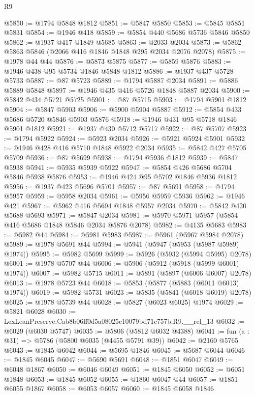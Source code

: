 \begin{lexlean}{R9}
\begin{coremodule}
@5850 := @1794 @5848 @1812
@5851 := @5847 @5850
@5853 := @5845 @5851 @5831
@5854 := @1946 @418
@5859 := @5854 @440 @5686 @5736 @5846 @5850
@5862 := @1937 @417 @1849 @5685
@5863 := @2033 @2034
@5873 := @5862 @5863 @5846 (@2066 @416 @1846 @1848 @295 @2034 @2076 @2078)
@5875 := @1978 @44 @44
@5876 := @5873 @5875
@5877 := @5859 @5876
@5883 := @1946 @438 @95 @5734 @1846 @5848 @1812
@5886 := @1937 @437 @5728 @5733
@5887 := @87 @5723
@5889 := @1794 @5887 @2034
@5891 := @5886 @5889 @5848
@5897 := @1946 @435 @416 @5726 @1848 @5887 @2034
@5900 := @5842 @434 @5721 @5725
@5901 := @87 @5715
@5903 := @1794 @5901 @1812
@5904 := @5847 @5903
@5906 := @5900 @5904 @5887
@5912 := @5854 @433 @5686 @5720 @5846 @5903 @5876
@5918 := @1946 @431 @95 @5718 @1846 @5901 @1812
@5921 := @1937 @430 @5712 @5717
@5922 := @87 @5707
@5923 := @1794 @5922
@5924 := @5923 @2034
@5926 := @5921 @5924 @5901
@5932 := @1946 @428 @416 @5710 @1848 @5922 @2034
@5935 := @5842 @427 @5705 @5709
@5936 := @87 @5699
@5938 := @1794 @5936 @1812
@5939 := @5847 @5938
@5941 := @5935 @5939 @5922
@5947 := @5854 @426 @5686 @5704 @5846 @5938 @5876
@5953 := @1946 @424 @95 @5702 @1846 @5936 @1812
@5956 := @1937 @423 @5696 @5701
@5957 := @87 @5691
@5958 := @1794 @5957
@5959 := @5958 @2034
@5961 := @5956 @5959 @5936
@5962 := @1946 @421
@5967 := @5962 @416 @5694 @1848 @5957 @2034
@5970 := @5842 @420 @5688 @5693
@5971 := @5847 @2034
@5981 := @5970 @5971 @5957 (@5854 @416 @5686 @1848 @5846 @2034 @5876 @2078)
@5982 := @4135 @5683
@5983 := @5982 @44
@5984 := @5981 @5983
@5987 := @5961 (@5967 @5984 @2078)
@5989 := @1978 @5691 @44
@5994 := @5941 (@5947 (@5953 (@5987 @5989) @1974))
@5995 := @5982 @5699
@5999 := @5926 (@5932 (@5994 @5995) @2078)
@6001 := @1978 @5707 @44
@6006 := @5906 (@5912 (@5918 (@5999 @6001) @1974))
@6007 := @5982 @5715
@6011 := @5891 (@5897 (@6006 @6007) @2078)
@6013 := @1978 @5723 @44
@6018 := @5853 (@5877 (@5883 (@6011 @6013) @1974))
@6019 := @5982 @5731
@6023 := @5835 (@5841 (@6018 @6019) @2078)
@6025 := @1978 @5739 @44
@6028 := @5827 (@6023 @6025) @1974
@6029 := @5821 @6028
@6030 := LexLeanPreserve.Cab8b06ff0d5a08025c10079bd71c757b.R9.__rel_13
@6032 := @6029 (@6030 @5747)
@6035 := @5806 (@5812 @6032 @4388)
@6041 := fun (a : @31) => @5786 (@5800 @6035 (@4455 @5791 @39))
@6042 := @2160 @5765
@6043 := @1845 @6042
@6044 := @5695 @1846
@6045 := @5687 @6044
@6046 := @1845 @6045
@6047 := @5690 @5691
@6048 := @1851 @6047
@6049 := @6048 @1867
@6050 := @6046 @6049
@6051 := @1845 @6050
@6052 := @6051 @1848
@6053 := @1845 @6052
@6055 := @1860 @6047 @44
@6057 := @1851 @6055 @1867
@6058 := @6053 @6057
@6060 := @1845 @6058 @1846

\end{coremodule}
\end{lexlean}
